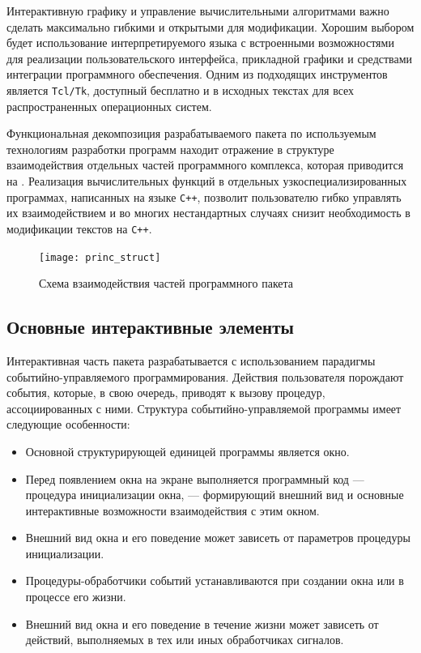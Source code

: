 Интерактивную графику и управление вычислительными алгоритмами важно
сделать максимально гибкими и открытыми для модификации.  Хорошим
выбором будет использование интерпретируемого языка с встроенными
возможностями для реализации пользовательского интерфейса, прикладной
графики и средствами интеграции программного обеспечения.  Одним из
подходящих инструментов является {\tt Tcl/Tk}, доступный бесплатно и в
исходных текстах для всех распространенных операционных систем.

Функциональная декомпозиция разрабатываемого пакета по используемым
технологиям разработки программ находит отражение в структуре
взаимодействия отдельных частей программного комплекса, которая
приводится на .  Реализация
вычислительных функций в отдельных узкоспециализированных программах,
написанных на языке {\tt C++}, позволит пользователю гибко управлять
их взаимодействием и во многих нестандартных случаях снизит
необходимость в модификации текстов на {\tt C++}.

\begin{figure}
\centerline{\texttt{[image: princ\_struct]}}
\caption{Схема взаимодействия частей программного пакета}
\label{fig:prog_interaction_struct}
\end{figure}

\subsection{Основные интерактивные элементы}

Интерактивная часть пакета разрабатывается с использованием парадигмы
событийно-управляемого программирования.  Действия пользователя
порождают события, которые, в свою очередь, приводят к вызову
процедур, ассоциированных с ними.  Структура событийно-управляемой
программы имеет следующие особенности:
\begin{itemize}
\item Основной структурирующей единицей программы является окно.
\item Перед появлением окна на экране выполняется программный код ---
  процедура инициализации окна, --- формирующий внешний вид и основные
  интерактивные возможности взаимодействия с этим окном.
\item Внешний вид окна и его поведение может зависеть от параметров
  процедуры инициализации.
\item Процедуры-обработчики событий устанавливаются при создании окна
  или в процессе его жизни.
\item Внешний вид окна и его поведение в течение жизни может зависеть
  от действий, выполняемых в тех или иных обработчиках сигналов.
\end{itemize}

